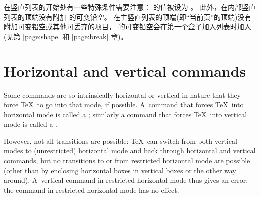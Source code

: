 \documentclass{book}
\begin{document}
在竖直列表的开始处有一些特殊条件需要注意：
 的值被设为 \n{-1000pt}。
此外，在内部竖直列表的顶端没有附加  的可变铅空。
在主竖直列表的顶端(即“当前页”的顶端)没有附加可变铅空或其他可丢弃的项目，
 的可变铅空会在第一个盒子加入列表时加入
(见第 \ref{page:shape} 和 \ref{page:break} 章)。

\section{Horizontal and vertical commands}

Some commands are so intrinsically horizontal or vertical
in nature that they force \TeX\ to go into that mode, if
possible. A~command that forces \TeX\ into horizontal mode
is called a ; similarly a command that
forces \TeX\ into vertical mode is called a
.

However, not all transitions are possible:
\TeX\ can switch from both vertical modes to 
(unrestricted) horizontal mode and back
through horizontal and vertical commands, but no transitions
to or from restricted horizontal mode are possible
(other than by enclosing horizontal boxes in vertical boxes or
the other way around).
A~vertical command in restricted horizontal mode thus gives
an error; the  command in restricted horizontal mode
has no effect.
\end{document}
